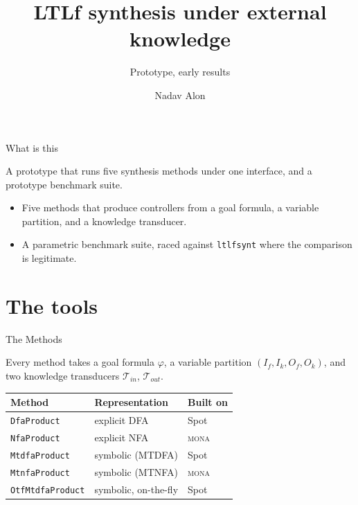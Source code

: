 \documentclass[aspectratio=169, 11pt]{beamer}
\title{LTLf synthesis under external knowledge}
\subtitle{Prototype, early results}
\author{Nadav Alon}
\newcommand{\Tin}{\mathcal{T}_{\mathit{in}}}
\newcommand{\Tout}{\mathcal{T}_{\mathit{out}}}
\newcommand{\Ifree}{I_{f}}
\newcommand{\Iknown}{I_{k}}
\newcommand{\Ofree}{O_{f}}
\newcommand{\Oknown}{O_{k}}
\begin{document}
\maketitle

\begin{frame}{What is this}

  A \alert{prototype} that runs five synthesis methods under one interface, and a prototype benchmark suite.

  \begin{itemize}
    \item Five methods that produce controllers from a goal formula, a variable partition, and a knowledge transducer.
    \item A parametric benchmark suite, raced against \texttt{ltlfsynt} where the comparison is legitimate.
  \end{itemize}

\end{frame}

\section{The tools}

\begin{frame}{The Methods}

  Every method takes a goal formula $\varphi$, a variable partition $(\Ifree, \Iknown, \Ofree, \Oknown)$, and two knowledge transducers $\Tin$, $\Tout$.

  \begin{center}\small
  \begin{tabular}{lll}
    \toprule
    Method & Representation & Built on \\
    \midrule
    \texttt{DfaProduct}       & explicit DFA      & Spot \\
    \texttt{NfaProduct}       & explicit NFA      & \textsc{mona} \\
    \texttt{MtdfaProduct}     & symbolic (MTDFA)  & Spot \\
    \texttt{MtnfaProduct}     & symbolic (MTNFA)  & \textsc{mona} \\
    \texttt{OtfMtdfaProduct}  & symbolic, on-the-fly & Spot \\
    \bottomrule
  \end{tabular}
  \end{center}

\end{frame}
\end{document}
